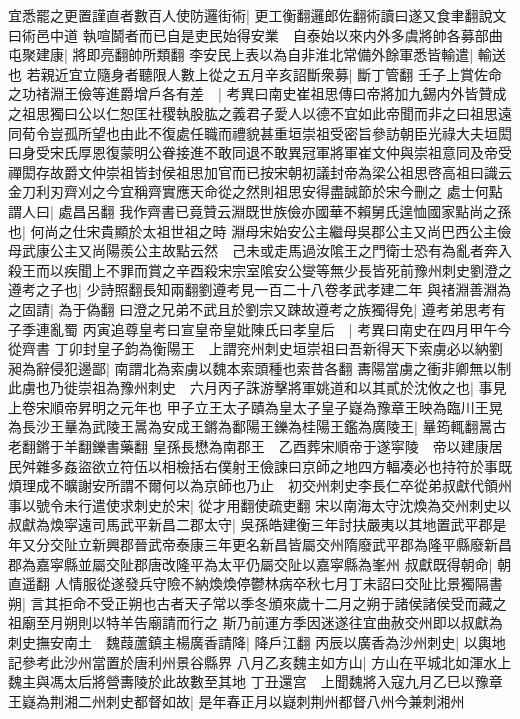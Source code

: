 宜悉罷之更置謹直者數百人使防邏街術|{
	更工衡翻邏郎佐翻術讀曰遂又食聿翻說文曰術邑中道}
執喧鬬者而已自是吏民始得安業　自泰始以來内外多虞將帥各募部曲屯聚建康|{
	將即亮翻帥所類翻}
李安民上表以為自非淮北常備外餘軍悉皆輸遣|{
	輸送也}
若親近宜立隨身者聽限人數上從之五月辛亥詔斷衆募|{
	斷丁管翻}
壬子上賞佐命之功禇淵王儉等進爵增戶各有差　|{
	考異曰南史崔祖思傳曰帝將加九錫内外皆贊成之祖思獨曰公以仁恕匡社稷執股肱之義君子愛人以德不宜如此帝聞而非之曰祖思遠同荀令豈孤所望也由此不復處任職而禮貌甚重垣崇祖受密旨參訪朝臣光祿大夫垣閎曰身受宋氏厚恩復蒙明公眷接進不敢同退不敢異冠軍將軍崔文仲與崇祖意同及帝受禪閎存故爵文仲崇祖皆封侯祖思加官而已按宋朝初議封帝為梁公祖思啓高祖曰識云金刀利刃齊刈之今宜稱齊實應天命從之然則祖思安得盡誠節於宋今刪之}
處士何點謂人曰|{
	處昌呂翻}
我作齊書已竟贊云淵既世族儉亦國華不賴舅氏遑恤國家點尚之孫也|{
	何尚之仕宋貴顯於太祖世祖之時}
淵母宋始安公主繼母吳郡公主又尚巴西公主儉母武康公主又尚陽羨公主故點云然　己未或走馬過汝隂王之門衛士恐有為亂者奔入殺王而以疾聞上不罪而賞之辛酉殺宋宗室隂安公燮等無少長皆死前豫州刺史劉澄之遵考之子也|{
	少詩照翻長知兩翻劉遵考見一百二十八卷孝武孝建二年}
與禇淵善淵為之固請|{
	為于偽翻}
曰澄之兄弟不武且於劉宗又踈故遵考之族獨得免|{
	遵考弟思考有子季連亂蜀}
丙寅追尊皇考曰宣皇帝皇妣陳氏曰孝皇后　|{
	考異曰南史在四月甲午今從齊書}
丁卯封皇子鈞為衡陽王　上謂兖州刺史垣崇祖曰吾新得天下索虜必以納劉昶為辭侵犯邊鄙|{
	南謂北為索虜以魏本索頭種也索昔各翻}
夀陽當虜之衝非卿無以制此虜也乃徙崇祖為豫州刺史　六月丙子誅游擊將軍姚道和以其貳於沈攸之也|{
	事見上卷宋順帝昇明之元年也}
甲子立王太子賾為皇太子皇子嶷為豫章王映為臨川王晃為長沙王曅為武陵王暠為安成王鏘為鄱陽王鑠為桂陽王鑑為廣陵王|{
	曅筠輒翻暠古老翻鏘于羊翻鑠書藥翻}
皇孫長懋為南郡王　乙酉葬宋順帝于遂寜陵　帝以建康居民舛雜多姦盜欲立符伍以相檢括右僕射王儉諫曰京師之地四方輻凑必也持符於事既煩理成不曠謝安所謂不爾何以為京師也乃止　初交州刺史李長仁卒從弟叔獻代領州事以號令未行遣使求刺史於宋|{
	從才用翻使疏吏翻}
宋以南海太守沈煥為交州刺史以叔獻為煥寜遠司馬武平新昌二郡太守|{
	吳孫皓建衡三年討扶嚴夷以其地置武平郡是年又分交阯立新興郡晉武帝泰康三年更名新昌皆屬交州隋廢武平郡為隆平縣廢新昌郡為嘉寜縣並屬交阯郡唐改隆平為太平仍屬交阯以嘉寜縣為峯州}
叔獻既得朝命|{
	朝直遥翻}
人情服從遂發兵守險不納煥煥停鬱林病卒秋七月丁未詔曰交阯比景獨隔書朔|{
	言其拒命不受正朔也古者天子常以季冬頒來歲十二月之朔于諸侯諸侯受而藏之祖廟至月朔則以特羊告廟請而行之}
斯乃前運方季因迷遂往宜曲赦交州即以叔獻為刺史撫安南土　魏葭蘆鎮主楊廣香請降|{
	降戶江翻}
丙辰以廣香為沙州刺史|{
	以輿地記參考此沙州當置於唐利州景谷縣界}
八月乙亥魏主如方山|{
	方山在平城北如渾水上魏主與馮太后將營夀陵於此故數至其地}
丁丑還宫　上聞魏將入寇九月乙巳以豫章王嶷為荆湘二州刺史都督如故|{
	是年春正月以嶷刺荆州都督八州今兼刺湘州}
